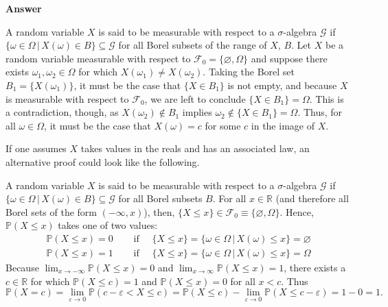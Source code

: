 \documentclass[11pt]{article}
\newcommand\ve{\varepsilon}
\renewcommand\P{\mathbb{P}} %
\newenvironment{hwanswer}
    {
        \vspace{2mm}
        {\bfseries Answer}
        \vspace{-\abovedisplayskip}
        \begin{center}
            \begin{tcolorbox}[
                width=0.95\textwidth,
                colback=white,
                colframe=white,
                opacityback=0,
                opacityframe=0,
                boxrule=0pt,
                frame hidden,
                breakable,
                before upper={\parindent15pt} %
            ]
            \lineskip=0pt %
    }
    {
        \end{tcolorbox}
        \end{center}
        \vspace{4mm}
    }
\begin{document}
    \begin{hwanswer}
        A random variable $X$ is said to be measurable with respect to a $\sigma$-algebra
        $\mathcal{G}$ if $\{ \omega \in \Omega \, | \, X(\omega) \in B \} \subseteq
        \mathcal{G}$ for all Borel subsets of the range of $X$, $B$. Let $X$ be a random
        variable measurable with respect to $\mathcal{F}_0 = \{ \varnothing, \Omega \}$ and
        suppose there exists $\omega_1, \omega_2 \in \Omega$ for which $X(\omega_1) \neq
        X(\omega_2)$. Taking the Borel set $B_1 = \{ X(\omega_1) \}$, it must be the case
        that $\{ X \in B_1 \}$ is not empty, and because $X$ is measurable with respect to
        $\mathcal{F}_0$, we are left to conclude $\{ X \in B_1 \} = \Omega$. This is a
        contradiction, though, as $X(\omega_2) \notin B_1$ implies $\omega_2 \notin \{ X
        \in B_1 \} = \Omega$. Thus, for all $\omega \in \Omega$, it must be the case that
        $X(\omega) = c$ for some $c$ in the image of $X$.

        \vspace{5mm}

        If one assumes $X$ takes values in the reals and has an associated law, an
        alternative proof could look like the following.

        A random variable $X$ is said to be measurable with respect to a $\sigma$-algebra
        $\mathcal{G}$ if $\{ \omega \in \Omega \, | \, X(\omega) \in B \} \subseteq
        \mathcal{G}$ for all Borel subsets $B$. For all $x \in \mathbb{R}$ (and therefore
        all Borel sets of the form $(-\infty, x)$), then, $\{ X \leq x \} \in \mathcal{F}_0
        \equiv \{ \varnothing, \Omega \}$. Hence, $\P(X \leq x)$ takes one of two values:
        \[
            \begin{aligned}
                \P(X \leq x) = 0
                &\quad \text{ if } \quad
                \{ X \leq x \}
                =
                \{ \omega \in \Omega\, | \, X(\omega) \leq x \} = \varnothing \\
                \P(X \leq x) = 1
                &\quad \text{ if } \quad
                \{ X \leq x \}
                =
                \{ \omega \in \Omega\, | \, X(\omega) \leq x \} = \Omega
            \end{aligned}
        \]
        Because $\lim_{x \to -\infty} \P(X \leq x) = 0$ and $\lim_{x \to \infty} \P(X \leq
        x) = 1$, there exists a $c \in \mathbb{R}$ for which $\P(X \leq c) = 1$ and $\P(X
        \leq x) = 0$ for all $x < c$. Thus
        \[
            \P(X = c)
            =
            \lim_{\ve \to 0} \P(c - \ve < X \leq c)
            =
            \P(X \leq c) - \lim_{\ve \to 0} \P(X \leq c - \ve)
            =
            1 - 0
            =
            1.
        \]
    \end{hwanswer}
\end{document}
